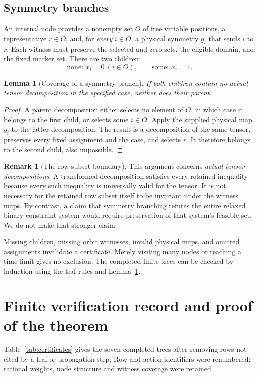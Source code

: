 \documentclass[11pt]{article}
\newtheorem{lemma}[theorem]{Lemma}
\theoremstyle{definition}
\newtheorem{remark}[theorem]{Remark}
\begin{document}
\subsection{Symmetry branches}
An internal node provides a nonempty set $O$ of free variable positions, a representative $r\in O$, and, for \emph{every} $i\in O$, a physical symmetry $g_i$ that sends $i$ to $r$. Each witness must preserve the selected and zero sets, the eligible domain, and the fixed marker set. There are two children:
\[
 \text{none: }x_i=0\ (i\in O),\qquad
 \text{some: }x_r=1.
\]
\begin{lemma}[Coverage of a symmetry branch]\label{lem:branch}
If both children contain no actual tensor decomposition in the specified case, neither does their parent.
\end{lemma}
\begin{proof}
A parent decomposition either selects no element of $O$, in which case it belongs to the first child, or selects some $i\in O$. Apply the supplied physical map $g_i$ to the latter decomposition. The result is a decomposition of the same tensor, preserves every fixed assignment and the case, and selects $r$. It therefore belongs to the second child, also impossible.
\end{proof}

\begin{remark}[The row-subset boundary]\label{rem:subset}
This argument concerns \emph{actual tensor decompositions}. A transformed decomposition satisfies every retained inequality because every such inequality is universally valid for the tensor. It is not necessary for the retained row subset itself to be invariant under the witness maps. By contrast, a claim that symmetry branching refutes the entire relaxed binary constraint system would require preservation of that system's feasible set. We do not make that stronger claim.
\end{remark}

Missing children, missing orbit witnesses, invalid physical maps, and omitted assignments invalidate a certificate. Merely visiting many nodes or reaching a time limit gives no exclusion. The completed finite trees can be checked by induction using the leaf rules and Lemma~\ref{lem:branch}.

\section{Finite verification record and proof of the theorem}
Table~\ref{tab:certificates} gives the seven completed trees after removing rows not cited by a leaf or propagation step. Row and action identifiers were renumbered; rational weights, node structure and witness coverage were retained.
\end{document}
